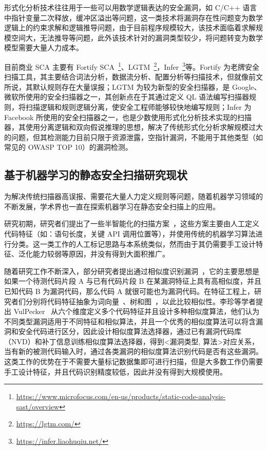 形式化分析技术往往用于一些可以用数学逻辑表达的安全漏洞，如 C/C++ 语言中指针变量二次释放，缓冲区溢出等问题，这一类技术将漏洞存在性问题变为数学逻辑上的约束求解和逻辑推导问题，由于目前程序规模较大，该技术面临着求解规模空间大，无法推导等问题，此外该技术针对的漏洞类型较少，将问题转变为数学模型需要大量人力成本。

目前商业 SCA 主要有 Fortify SCA~\footnote{\url{https://www.microfocus.com/en-us/products/static-code-analysis-sast/overview}}、LGTM~\footnote{\url{https://lgtm.com/}}，Infer~\footnote{\url{https://infer.liaohuqiu.net/}}等。Fortify 为老牌安全扫描工具，其主要结合词法分析，数据流分析、配置分析等扫描技术，但就像前文所说，其默认规则存在大量误报；LGTM 为较为新型的安全扫描器，是 Google、微软所使用的安全扫描器之一，其创新点在于其通过定义 QL 语法编写扫描器规则，将扫描逻辑和规则逻辑分离，使安全工程师能够较快地编写规则；Infer 为 Facebook 所使用的安全扫描器之一，也是少数使用形式化分析技术实现的扫描器，其使用分离逻辑和双向假说推理的思想，解决了传统形式化分析求解规模过大的问题，但其检测能力目前只限于资源泄露，空指针漏洞，不能用于其他类型（如常见的 OWASP TOP 10）的漏洞检测。

\subsection{基于机器学习的静态安全扫描研究现状}

为解决传统扫描器高误报、需要花大量人力定义规则等问题，随着机器学习领域的不断发展，学术界也一直在探索机器学习在静态安全扫描上的应用。

研究初期，研究者们提出了一些半智能化的扫描方案~\cite{aletheia,zranking,ayukselCaseStudy}，这些方案主要由人工定义代码特征（如：语句长度，关键 API 调用位置等），并使用传统的机器学习算法进行分类。这一类工作的人工标记思路与本系统类似，然而由于其仍需要手工设计特征、泛化能力较弱等原因，并没有得到大面积推广。

随着研究工作不断深入，部分研究者提出通过相似度识别漏洞~\cite{vuddy,li2016vulpecker}，它的主要思想是如果一个待测代码片段 A 与已有代码片段 B 在某漏洞特征上具有高相似度，并且已知代码 B 为漏洞代码，那么代码 A 就很可能也为漏洞代码。在特征工程上，研究者们分别将代码特征抽象为词向量~\cite{vuddy}、树和图~\cite{simtree}，以此比较相似性。李珍等学者提出 VulPecker~\cite{li2016vulpecker} 从六个维度定义多个代码特征并且设计多种相似度算法，他们认为不同类型漏洞适用于不同特征和相似算法，并且一个优秀的相似度算法可以将含漏洞和安全代码进行区分，因此设计相似度算法选择器，通过已有漏洞代码库（NVD）和补丁信息训练相似度算法选择器，得到<漏洞类型, 算法>对应关系，当有新的被测代码输入时，通过各类漏洞的相似度算法识别代码是否有这些漏洞。这类工作的优势在于不需要大量标记数据集即可进行扫描，但是大多数工作仍需要手工设计特征，并且代码识别精度较低，因此并没有得到大规模使用。

